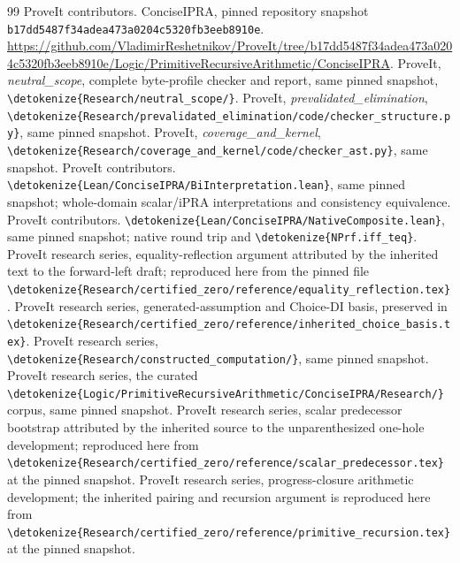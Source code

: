 \documentclass[11pt,letterpaper]{article}
\theoremstyle{definition}\newtheorem{definition}[theorem]{Definition}
\theoremstyle{remark}\newtheorem{remark}[theorem]{Remark}
\newcommand{\file}[1]{\expandafter\nolinkurl\expandafter{\detokenize{#1}}}
\begin{document}
\begingroup\footnotesize\raggedright\setlength{\parskip}{0pt}
\begin{thebibliography}{99}
\setlength{\itemsep}{2pt}
 ProveIt contributors. ConciseIPRA, pinned repository
snapshot \texttt{b17dd5487f34adea473a0204c5320fb3eeb8910e}.
\url{https://github.com/VladimirReshetnikov/ProveIt/tree/b17dd5487f34adea473a0204c5320fb3eeb8910e/Logic/PrimitiveRecursiveArithmetic/ConciseIPRA}.
 ProveIt, \emph{neutral\_scope}, complete byte-profile
checker and report, same pinned snapshot, \file{Research/neutral_scope/}.
 ProveIt, \emph{prevalidated\_elimination},
\file{Research/prevalidated_elimination/code/checker_structure.py},
same pinned snapshot.
 ProveIt, \emph{coverage\_and\_kernel},
\file{Research/coverage_and_kernel/code/checker_ast.py}, same snapshot.
 ProveIt contributors. \file{Lean/ConciseIPRA/BiInterpretation.lean},
same pinned snapshot; whole-domain scalar/iPRA interpretations and
consistency equivalence.
 ProveIt contributors.
\file{Lean/ConciseIPRA/NativeComposite.lean}, same pinned snapshot;
native round trip and \file{NPrf.iff_teq}.
 ProveIt research series, equality-reflection argument
attributed by the inherited text to the forward-left draft; reproduced
here from the pinned file
\file{Research/certified_zero/reference/equality_reflection.tex}.
 ProveIt research series, generated-assumption and
Choice-DI basis, preserved in
\file{Research/certified_zero/reference/inherited_choice_basis.tex}.
 ProveIt research series,
\file{Research/constructed_computation/}, same pinned snapshot.
 ProveIt research series, the curated
\file{Logic/PrimitiveRecursiveArithmetic/ConciseIPRA/Research/} corpus,
same pinned snapshot.
 ProveIt research series, scalar predecessor bootstrap
attributed by the inherited source to the unparenthesized one-hole
development; reproduced here from
\file{Research/certified_zero/reference/scalar_predecessor.tex} at the
pinned snapshot.
 ProveIt research series, progress-closure arithmetic
development; the inherited pairing and recursion argument is reproduced
here from \file{Research/certified_zero/reference/primitive_recursion.tex}
at the pinned snapshot.
\end{thebibliography}
\endgroup
\end{document}

